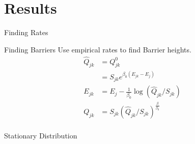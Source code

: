 \documentclass{beamer}
\begin{document}
\section{Results}
\begin{frame}{Finding Rates}
\end{frame}
\begin{frame}{Finding Barriers}
Use empirical rates to find Barrier heights. 
\begin{align}
\hat{Q}_{jk} &= Q^0_{jk} \\
	&= S_{jk}e^{\beta_0(E_{jk} - E_j)} \\
E_{jk} &= E_j-\frac{1}{\beta_0}\log\left(\hat{Q}_{jk}/S_{jk}\right) \\
Q_{jk} &= S_{jk}\left(\hat{Q}_{jk}/S_{jk}\right)^{\frac{\beta}{\beta_0}} \\
\end{align}


\end{frame}
\begin{frame}{Stationary Distribution}
  \centering
\end{frame}
\end{document}
